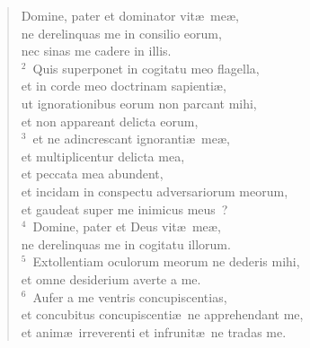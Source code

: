 \begin{flushleft}\begin{verse}\vspace{-19pt}\hspace{6pt}Domine, pater et dominator vit\ae\ me\ae ,\\\hspace{6pt} ne derelinquas me in consilio eorum,\\ nec sinas me cadere in illis.\\
${}^{2}$~Quis superponet in cogitatu meo flagella,\\ et in corde meo doctrinam sapienti\ae ,\\ ut ignorationibus eorum non parcant mihi,\\ et non appareant delicta eorum,\\
${}^{3}$~et ne adincrescant ignoranti\ae\ me\ae ,\\ et multiplicentur delicta mea,\\ et peccata mea abundent,\\ et incidam in conspectu adversariorum meorum,\\ et gaudeat super me inimicus meus~?\\
${}^{4}$~Domine, pater et Deus vit\ae\ me\ae ,\\ ne derelinquas me in cogitatu illorum.\\
${}^{5}$~Extollentiam oculorum meorum ne dederis mihi,\\ et omne desiderium averte a me.\\
${}^{6}$~Aufer a me ventris concupiscentias,\\ et concubitus concupiscenti\ae\ ne apprehendant me,\\ et anim\ae\ irreverenti et infrunit\ae\ ne tradas me.\end{verse}\end{flushleft}



